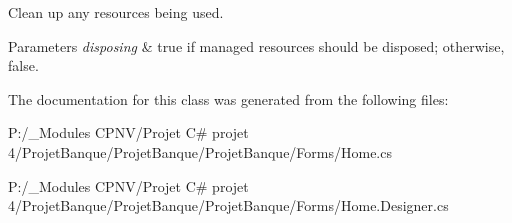 Clean up any resources being used. 


\begin{DoxyParams}{Parameters}
{\em disposing} & true if managed resources should be disposed; otherwise, false.\\
\hline
\end{DoxyParams}


The documentation for this class was generated from the following files\+:\begin{DoxyCompactItemize}
\item 
P\+:/\+\_\+\+Modules C\+P\+N\+V/\+Projet C\# projet 4/\+Projet\+Banque/\+Projet\+Banque/\+Projet\+Banque/\+Forms/Home.\+cs\item 
P\+:/\+\_\+\+Modules C\+P\+N\+V/\+Projet C\# projet 4/\+Projet\+Banque/\+Projet\+Banque/\+Projet\+Banque/\+Forms/Home.\+Designer.\+cs\end{DoxyCompactItemize}
